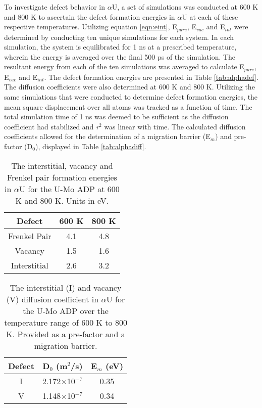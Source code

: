 \documentclass[review]{elsarticle}
\begin{document}
To investigate defect behavior in $\alpha$U, a set of simulations was conducted at 600 K and 800 K to ascertain the defect formation energies in $\alpha$U at each of these respective temperatures. Utilizing equation \ref{eqn:eint}, E$_{pure}$, E$_{vac}$ and E$_{int}$ were determined by conducting ten unique simulations for each system. In each simulation, the system is equilibrated for 1 ns at a prescribed temperature, wherein the energy is averaged over the final 500 ps of the simulation. The resultant energy from each of the ten simulations was averaged to calculate E$_{pure}$, E$_{vac}$ and E$_{int}$. The defect formation energies are presented in Table \ref{tab:alphadef}. The diffusion coefficients were also determined at 600 K and 800 K. Utilizing the same simulations that were conducted to determine defect formation energies, the mean square displacement over all atoms was tracked as a function of time. The total simulation time of 1 ns was deemed to be sufficient as the diffusion coefficient had stabilized and \textit{r}$^{2}$ was linear with time. The calculated diffusion coefficients allowed for the determination of a migration barrier (E$_{m}$) and pre-factor (D$_{0}$), displayed in Table \ref{tab:alphadiff}.

\begin{table}[h]
\caption{The interstitial, vacancy and Frenkel pair formation energies in $\alpha$U for the U-Mo ADP at 600 K and 800 K. Units in eV.} \label{tab:alphadef}
\begin{center}
\begin{tabular}{|c|c|c|}
	\hline
	Defect & 600 K & 800 K\\
	 \hline
	Frenkel Pair	& 4.1 & 4.8 \\
	Vacancy		& 1.5 & 1.6 \\
	Interstitial		& 2.6 & 3.2 \\
	\hline
\end{tabular}
\end{center}
\label{default}
\end{table}

\begin{table}[h]
\caption{The interstitial (I) and vacancy (V) diffusion coefficient in $\alpha$U for the U-Mo ADP over the temperature range of 600 K to 800 K. Provided as a pre-factor and a migration barrier.} \label{tab:alphadiff}
\begin{center}
\begin{tabular}{|c|c|c|}
	\hline
	Defect & D$_{0}$ (m$^{2}$/s) & E$_{m}$ (eV)\\
	 \hline
	 I & 2.172$\times$10$^{-7}$ & 0.35 \\
	 V & 1.148$\times$10$^{-7}$ & 0.34 \\
	\hline
\end{tabular}
\end{center}
\label{default}
\end{table}
\end{document}
